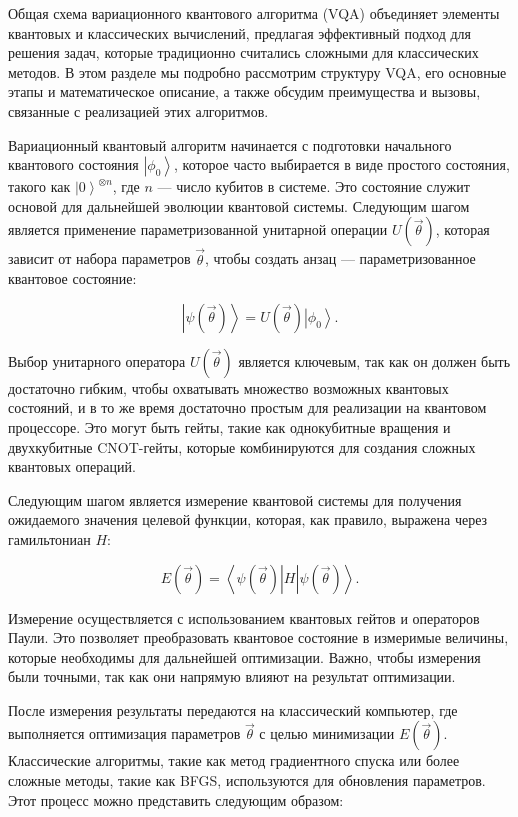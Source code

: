 \documentclass[a4paper]{report}
\newcommand{\ket}[1] {{\ensuremath{\left|#1\right\rangle}}}
\newcommand{\bra}[1] {{\ensuremath{\left\langle#1\right|}}}
\begin{document}
Общая схема вариационного квантового алгоритма (VQA) объединяет элементы квантовых и классических вычислений, предлагая эффективный подход для решения задач, которые традиционно считались сложными для классических методов. В этом разделе мы подробно рассмотрим структуру VQA, его основные этапы и математическое описание, а также обсудим преимущества и вызовы, связанные с реализацией этих алгоритмов.

Вариационный квантовый алгоритм начинается с подготовки начального квантового состояния $\ket{\phi_0}$, которое часто выбирается в виде простого состояния, такого как $\ket{0}^{\otimes n}$, где $n$ — число кубитов в системе. Это состояние служит основой для дальнейшей эволюции квантовой системы. Следующим шагом является применение параметризованной унитарной операции $U(\vec{\theta})$, которая зависит от набора параметров $\vec{\theta}$, чтобы создать анзац — параметризованное квантовое состояние:

\begin{equation}
\ket{\psi(\vec{\theta})} = U(\vec{\theta}) \ket{\phi_0}.
\end{equation}

Выбор унитарного оператора $U(\vec{\theta})$ является ключевым, так как он должен быть достаточно гибким, чтобы охватывать множество возможных квантовых состояний, и в то же время достаточно простым для реализации на квантовом процессоре. Это могут быть гейты, такие как однокубитные вращения и двухкубитные CNOT-гейты, которые комбинируются для создания сложных квантовых операций.

Следующим шагом является измерение квантовой системы для получения ожидаемого значения целевой функции, которая, как правило, выражена через гамильтониан $H$:

\begin{equation}
E(\vec{\theta}) = \bra{\psi(\vec{\theta})} H \ket{\psi(\vec{\theta})}.
\end{equation}

Измерение осуществляется с использованием квантовых гейтов и операторов Паули. Это позволяет преобразовать квантовое состояние в измеримые величины, которые необходимы для дальнейшей оптимизации. Важно, чтобы измерения были точными, так как они напрямую влияют на результат оптимизации.

После измерения результаты передаются на классический компьютер, где выполняется оптимизация параметров $\vec{\theta}$ с целью минимизации $E(\vec{\theta})$. Классические алгоритмы, такие как метод градиентного спуска или более сложные методы, такие как BFGS, используются для обновления параметров. Этот процесс можно представить следующим образом:
\end{document}
